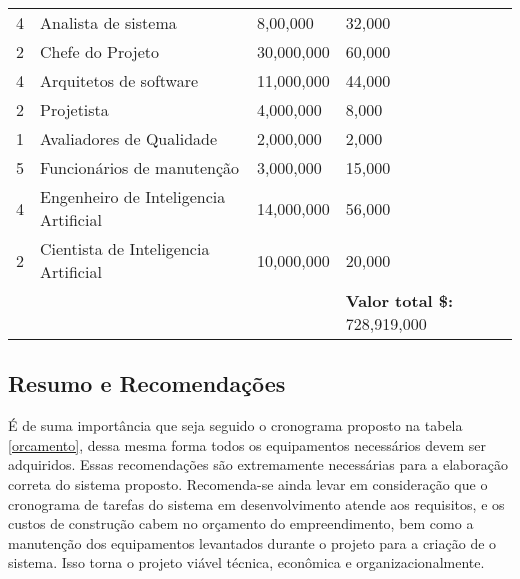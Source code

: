 \begin{tabular}{ |p{3cm}||p{3cm}|p{3cm}|p{3cm}|  }
      4                   & Analista de sistema                                                                           & 8,00,000               & 32,000                               \\
      2                   & Chefe do Projeto                                                                              & 30,000,000             & 60,000                               \\
      4                   & Arquitetos de software                                                                        & 11,000,000             & 44,000                               \\
      2                   & Projetista                                                                                    & 4,000,000              & 8,000                                \\
      1                   & Avaliadores de Qualidade                                                                      & 2,000,000              & 2,000                                \\
      5                   & Funcionários de manutenção                                                                    & 3,000,000              & 15,000                               \\
      4                   & Engenheiro de Inteligencia Artificial                                                         & 14,000,000             & 56,000                               \\
      2                   & Cientista de Inteligencia Artificial                                                          & 10,000,000             & 20,000                               \\
      \hline
                          &                                                                                               &                        & \textbf{Valor total \$:} 728,919,000
      \\
      \hline
\end{tabular}

\subsection{Resumo e Recomenda\c{c}\~{o}es}
É de suma importância que seja seguido o cronograma proposto na tabela \ref{orcamento}, dessa mesma forma todos os equipamentos necessários devem ser adquiridos. Essas recomendações são extremamente necessárias para a elaboração correta do sistema proposto.
Recomenda-se ainda levar em consideração que o cronograma de tarefas do sistema em desenvolvimento atende aos requisitos, e os custos de construção cabem no orçamento do empreendimento, bem como a manutenção dos equipamentos levantados durante o projeto para a criação de o sistema. Isso torna o projeto viável técnica, econômica e organizacionalmente.
